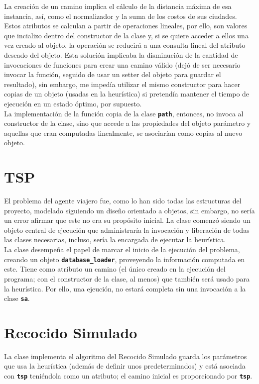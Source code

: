 \documentclass[a4paper]{report}
\begin{document}
La creaci\'on de un camino implica el c\'alculo de la distancia m\'axima de esa instancia, as\'i, como el
normalizador y la suma de los costos de sus ciudades. Estos atributos se calculan a partir de operaciones
lineales, por ello, son valores que incializo dentro del constructor de la clase y, si se quiere acceder
a ellos una vez creado al objeto, la operaci\'on se reducir\'a a una consulta lineal del atributo deseado
del objeto. Esta soluci\'on implicaba la disminuci\'on de la cantidad de invocaciones de funciones para
crear una camino v\'alido (dej\'o de ser necesario invocar la funci\'on, seguido de usar un setter del
objeto para guardar el resultado), sin embargo, me imped\'ia utilizar el mismo constructor para hacer copias
de un objeto (usadas en la heur\'istica) si pretend\'ia mantener el tiempo de ejecuci\'on en un estado
\'optimo, por supuesto.\\

La implementaci\'on de la funci\'on copia de la clase \textbf{\texttt{path}}, entonces, no invoca al
constructor de la clase, sino que accede a las propiedades del objeto par\'ametro y aquellas que eran
computadas linealmente, se asociar\'ian como copias al nuevo objeto.

\section{TSP}
El problema del agente viajero fue, como lo han sido todas las estructuras del proyecto, modelado siguiendo
un dise\~no orientado a objetos, sin embargo, no ser\'ia un error afirmar que este no era su prop\'osito inicial.
La clase comenz\'o siendo un objeto central de ejecuci\'on que administrar\'ia la invocaci\'on y liberaci\'on
de todas las clases necesarias, incluso, ser\'ia la encargada de ejecutar la heur\'istica.\\

La clase desempe\~na el papel de marcar el inicio de la ejecuci\'on del problema, creando un objeto
\textbf{\texttt{database\_loader}}, proveyendo la informaci\'on computada en este.
Tiene como atributo un camino (el \'unico creado en la ejecuci\'on del programa; con el constructor
de la clase, al menos) que tambi\'en ser\'a usado para la heur\'istica. Por ello, una ejeuci\'on,
no estar\'a completa sin una invocaci\'on a la clase \textbf{\texttt{sa}}.

\section{Recocido Simulado}
La clase implementa el algoritmo del Recocido Simulado guarda los par\'ametros que usa la heur\'istica
(adem\'as de definir unos predeterminados) y est\'a asociada con \textbf{\texttt{tsp}} teni\'endola
como un atributo; el camino inicial es proporcionado por \textbf{\texttt{tsp}}.\\
\end{document}
